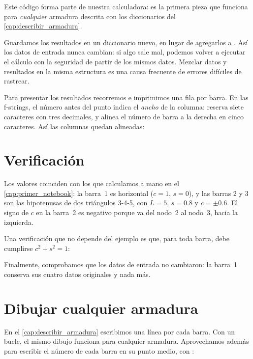 Este código forma parte de nuestra calculadora: es la primera pieza que
funciona para \emph{cualquier} armadura descrita con los diccionarios del
\cref{cap:describir_armadura}.

\begin{cuidado}
Guardamos los resultados en un diccionario nuevo, en lugar de agregarlos a
. Así los datos de entrada nunca cambian: si algo sale mal, podemos
volver a ejecutar el cálculo con la seguridad de partir de los mismos datos.
Mezclar datos y resultados en la misma estructura es una causa frecuente de
errores difíciles de rastrear.
\end{cuidado}

Para presentar los resultados recorremos  e imprimimos una fila
por barra. En las f-strings, el número antes del punto indica el
\emph{ancho} de la columna:  reserva siete caracteres con tres
decimales, y  alinea el número de barra a la derecha en cinco
caracteres. Así las columnas quedan alineadas:

\section{Verificación}\label{sec:verificacion_geometria}

Los valores coinciden con los que calculamos a mano en el
\cref{cap:primer_notebook}: la barra~1 es horizontal ($c = 1$, $s = 0$), y las
barras 2 y 3 son las hipotenusas de dos triángulos 3-4-5, con $L = 5$, $s =
0.8$ y $c = \pm 0.6$. El signo de $c$ en la barra~2 es negativo porque va del
nodo~2 al nodo~3, hacia la izquierda.

Una verificación que no depende del ejemplo es que, para toda barra, debe
cumplirse $c^2 + s^2 = 1$:

Finalmente, comprobamos que los datos de entrada no cambiaron: la barra~1
conserva sus cuatro datos originales y nada más.

\section{Dibujar cualquier armadura}\label{sec:dibujar_cualquier}

En el \cref{cap:describir_armadura} escribimos una línea  por
cada barra. Con un bucle, el mismo dibujo funciona para cualquier armadura.
Aprovechamos además para escribir el número de cada barra en su punto medio,
con :

